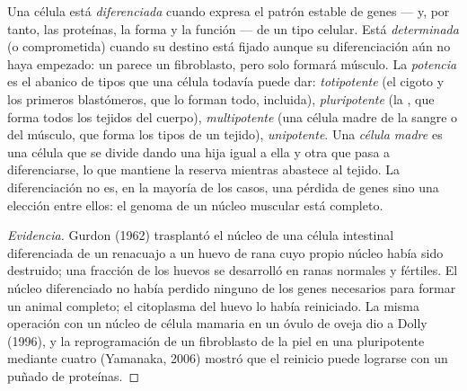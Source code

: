 \begin{definition}\label{def:b2:cell-differentiation:differentiation}
Una célula está \emph{diferenciada} cuando expresa el patrón estable de
genes --- y, por tanto, las proteínas, la forma y la función --- de un tipo
celular. Está \emph{determinada} (o comprometida) cuando su destino está
fijado aunque su diferenciación aún no haya empezado: un  parece
un fibroblasto, pero solo formará músculo. La \emph{potencia} es el
abanico de tipos que una célula todavía puede dar: \emph{totipotente} (el
cigoto y los primeros blastómeros, que lo forman todo, 
incluida), \emph{pluripotente} (la , que forma todos
los tejidos del cuerpo), \emph{multipotente} (una célula madre de la
sangre o del músculo, que forma los tipos de un tejido),
\emph{unipotente}. Una \emph{célula madre} es una célula que se divide
dando una hija igual a ella y otra que pasa a diferenciarse, lo que
mantiene la reserva mientras abastece al tejido. La diferenciación no es,
en la mayoría de los casos, una pérdida de genes sino una elección entre
ellos: el genoma de un núcleo muscular está completo.
\end{definition}
\begin{proof}[Evidencia]
Gurdon (1962) trasplantó el núcleo de una célula intestinal diferenciada
de un renacuajo a un huevo de rana cuyo propio núcleo había sido
destruido; una fracción de los huevos se desarrolló en ranas normales y
fértiles. El núcleo diferenciado no había perdido ninguno de los genes
necesarios para formar un animal completo; el citoplasma del huevo lo había
reiniciado. La misma operación con un núcleo de célula mamaria en un
óvulo de oveja dio a Dolly (1996), y la reprogramación de un fibroblasto
de la piel en una  pluripotente mediante cuatro  (Yamanaka, 2006) mostró que el reinicio puede lograrse con
un puñado de proteínas.
\end{proof}

